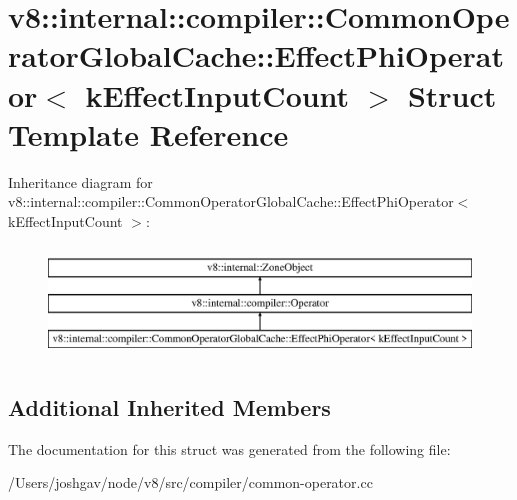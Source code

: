 \hypertarget{structv8_1_1internal_1_1compiler_1_1_common_operator_global_cache_1_1_effect_phi_operator}{}\section{v8\+:\+:internal\+:\+:compiler\+:\+:Common\+Operator\+Global\+Cache\+:\+:Effect\+Phi\+Operator$<$ k\+Effect\+Input\+Count $>$ Struct Template Reference}
\label{structv8_1_1internal_1_1compiler_1_1_common_operator_global_cache_1_1_effect_phi_operator}
Inheritance diagram for v8\+:\+:internal\+:\+:compiler\+:\+:Common\+Operator\+Global\+Cache\+:\+:Effect\+Phi\+Operator$<$ k\+Effect\+Input\+Count $>$\+:\begin{figure}[H]
\begin{center}
\leavevmode
\includegraphics[height=3.000000cm]{structv8_1_1internal_1_1compiler_1_1_common_operator_global_cache_1_1_effect_phi_operator}
\end{center}
\end{figure}
\subsection*{Additional Inherited Members}


The documentation for this struct was generated from the following file\+:\begin{DoxyCompactItemize}
\item 
/\+Users/joshgav/node/v8/src/compiler/common-\/operator.\+cc\end{DoxyCompactItemize}
